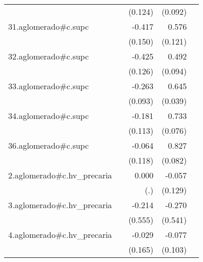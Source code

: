 {\begin{longtable}{l*{4}{D{.}{.}{-1}}}
            &                     &     (0.124)         &     (0.092)         &                     \\
\addlinespace
31.aglomerado#c.supc&                     &      -0.417\sym{**} &       0.576\sym{***}&                     \\
            &                     &     (0.150)         &     (0.121)         &                     \\
\addlinespace
32.aglomerado#c.supc&                     &      -0.425\sym{***}&       0.492\sym{***}&                     \\
            &                     &     (0.126)         &     (0.094)         &                     \\
\addlinespace
33.aglomerado#c.supc&                     &      -0.263\sym{**} &       0.645\sym{***}&                     \\
            &                     &     (0.093)         &     (0.039)         &                     \\
\addlinespace
34.aglomerado#c.supc&                     &      -0.181         &       0.733\sym{***}&                     \\
            &                     &     (0.113)         &     (0.076)         &                     \\
\addlinespace
36.aglomerado#c.supc&                     &      -0.064         &       0.827\sym{***}&                     \\
            &                     &     (0.118)         &     (0.082)         &                     \\
\addlinespace
2.aglomerado#c.hv\_precaria&                     &       0.000         &      -0.057         &                     \\
            &                     &         (.)         &     (0.129)         &                     \\
\addlinespace
3.aglomerado#c.hv\_precaria&                     &      -0.214         &      -0.270         &                     \\
            &                     &     (0.555)         &     (0.541)         &                     \\
\addlinespace
4.aglomerado#c.hv\_precaria&                     &      -0.029         &      -0.077         &                     \\
            &                     &     (0.165)         &     (0.103)         &                     \\

\end{longtable}}
